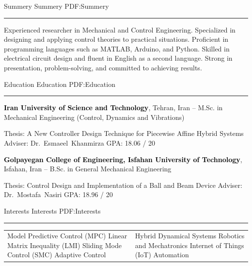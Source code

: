 \documentclass[letterpaper,MMMyyyy]{CVTemplate}
\begin{document}
\begin{Body}

\Section
{Summery}
{Summery}
{PDF:Summery}
\textcolor{Forestg}{\vspace{0.10cm}\hrule height 0.1cm}\BigGap\Gap
\Entry
\BulletItem Experienced researcher in Mechanical and Control Engineering.
\BulletItem Specialized in designing and applying control theories to practical situations.
\BulletItem Proficient in programming languages such as MATLAB, Arduino, and Python.
\BulletItem Skilled in electrical circuit design and fluent in English as a second language.
\BulletItem Strong in presentation, problem-solving, and committed to achieving results.

\Section
{Education}
{Education}
{PDF:Education}
\textcolor{Forestg}{\vspace{0.10cm}\hrule height 0.1cm}\BigGap\Gap
\Entry
{\textcolor{black}{\textbf{Iran University of Science and Technology}}, Tehran, Iran}
\hfill
{\textcolor{OrangeY}{ --
	}}
\Gap
\BulletItem
M.Sc. in
{Mechanical Engineering \small{(Control, Dynamics and Vibrations)}}

\begin{Detail}
\SubBulletItem
Thesis:
{A New Controller Design Technique for Piecewise Affine Hybrid Systems}
\SubBulletItem
Adviser:
Dr.~Esmaeel~Khanmirza
\SubBulletItem
GPA: 18.06 / 20
\end{Detail}


\BigGap
\Entry
{\textcolor{black}{\textbf{Golpayegan College of Engineering, Isfahan University of Technology}},
Isfahan, Iran}
\hfill
\textcolor{OrangeY}{ --
}
\Gap
\BulletItem
B.Sc. in
{General Mechanical Engineering}

\begin{Detail}
\SubBulletItem
Thesis: Control Design and Implementation of a Ball and Beam Device
\SubBulletItem
Adviser:
Dr.~Mostafa~Nasiri
\SubBulletItem
GPA: 18.96 / 20
\end{Detail}



\Section
{Interests}
{Interests}
{PDF:Interests}
\textcolor{Forestg}{\vspace{0.10cm}\hrule height 0.1cm}\BigGap\Gap
\Entry

\begin{center}
	\begin{tabular}{ m{8cm} m{8cm} }
		\BulletItem
		Model Predictive Control (MPC)
		\BulletItem
		Linear Matrix Inequality (LMI)
		\BulletItem
		Sliding Mode Control (SMC)
		\BulletItem
		Adaptive Control
		 & \BulletItem
		Hybrid Dynamical Systems
		\BulletItem
		Robotics and Mechatronics
		\BulletItem
		Internet of Things (IoT)
		\BulletItem
		Automation
	\end{tabular}
\end{center}
\vspace{6pt}



\end{Body}
\end{document}
